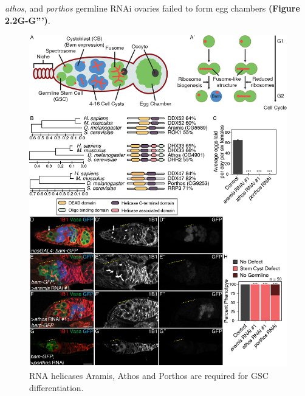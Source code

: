 \documentclass[12pt,oneside]{reedthesis}
\begin{document}
\emph{athos}, and \emph{porthos} germline RNAi ovaries failed to form egg chambers
\textbf{(Figure 2.2G-G''')}.
\begin{figure}

{\centering \includegraphics[width=6.5 in,height=8.9375 in]{./figure/Ribosome Biogenesis/Ribosome Biogenesis 1} 

}

\caption[RNA helicases Aramis, Athos and Porthos are required for GSC differentiation.]{RNA helicases Aramis, Athos and Porthos are required for GSC differentiation.}\label{fig:unnamed-chunk-6}
\end{figure}
\end{document}
